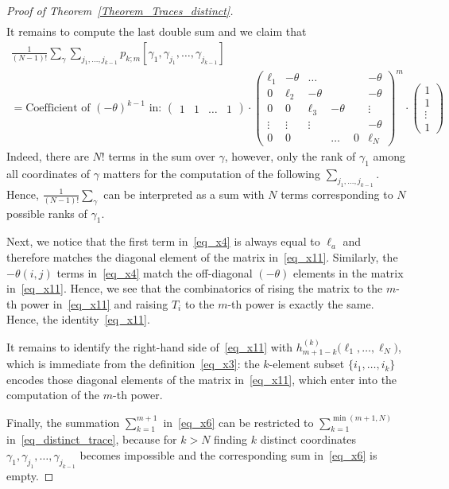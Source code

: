 \documentclass[11pt]{article}
\theoremstyle{definition}
\numberwithin{equation}{section}
\begin{document}
\begin{proof}[Proof of Theorem~\ref{Theorem_Traces_distinct}]
\begin{multline}
\end{multline}
It remains to compute the last double sum and we claim that
\begin{multline}
\label{eq_x11}
  \frac{1}{(N-1)!}\sum_{\gamma}  \sum_{j_1,\dots,j_{k-1}} p_{k;m}[\gamma_1,\gamma_{j_1},\dots,\gamma_{j_{k-1}}]\\=
  \text{Coefficient of }(-\theta)^{k-1}\text{ in: }
 \begin{pmatrix}1&1&\dots&1\end{pmatrix} \cdot
   \begin{pmatrix}
                 \ell_1& -\theta &\dots & && -\theta \\
                 0 & \ell_2& -\theta &&& -\theta\\
                 0 & 0 & \ell_3 & -\theta && \vdots\\
                 \vdots &\vdots &\vdots&&& -\theta\\
                 0 &0 &&\dots &0 &\ell_N
  \end{pmatrix}^m
  \cdot \begin{pmatrix} 1\\ 1 \\ \vdots \\ 1 \end{pmatrix}
\end{multline}
Indeed, there are $N!$ terms in the sum over $\gamma$, however, only the rank of $\gamma_1$ among all coordinates of $\gamma$ matters for the computation
of the following $ \sum_{j_1,\dots,j_{k-1}}$. Hence, $\frac{1}{(N-1)!}\sum_{\gamma}$ can be interpreted as a sum with $N$ terms corresponding to $N$ possible
ranks of $\gamma_1$.

Next, we notice that the first term in~\eqref{eq_x4} is always equal to $\ell_a$ and therefore matches the diagonal element of the matrix
in~\eqref{eq_x11}. Similarly, the $-\theta(i,j)$ terms in~\eqref{eq_x4} match the off-diagonal $(-\theta)$ elements in the matrix  in~\eqref{eq_x11}.
Hence, we see that the combinatorics of rising the matrix to the $m$-th power in~\eqref{eq_x11} and raising $T_i$ to the $m$-th power is exactly
the same. Hence, the identity~\eqref{eq_x11}.

It remains to identify the right-hand side of~\eqref{eq_x11} with  $h^{(k)}_{m+1-k}\bigl(\ell_1,\dots,\ell_N\bigr)$, which is immediate from the definition~\eqref{eq_x3}: the $k$-element subset $\{i_1,\dots,i_k\}$ encodes those diagonal elements of the matrix in~\eqref{eq_x11}, which enter into the computation of the $m$-th power.

Finally, the summation $\sum_{k=1}^{m+1}$ in~\eqref{eq_x6} can be restricted to $\sum_{k=1}^{\min(m+1,N)}$ in~\eqref{eq_distinct_trace}, because for $k>N$ finding $k$ distinct coordinates $\gamma_1,\gamma_{j_1},\dots,\gamma_{j_{k-1}}$ becomes impossible and the corresponding sum in~\eqref{eq_x6} is empty.
\end{proof}
\end{document}

